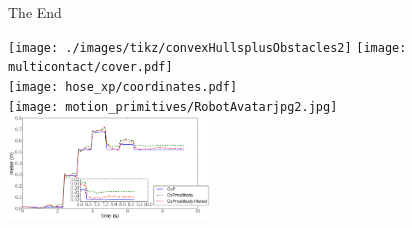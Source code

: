 \documentclass{beamer}
\begin{document}
\begin{frame}{The End}
\vspace*{-0.5cm}
\begin{center}
\texttt{[image: ./images/tikz/convexHullsplusObstacles2]}
\hspace*{1cm}
\texttt{[image: multicontact/cover.pdf]}\\
\texttt{[image: hose\_xp/coordinates.pdf]}
\scalebox{0.7}{}\\
\texttt{[image: motion\_primitives/RobotAvatarjpg2.jpg]}
\hspace*{1cm}
\includegraphics[width=0.4\textwidth, height=0.25\textheight, keepaspectratio]
{./figures/nmpc_walkgen/copmbpres.pdf}
\end{center}
\end{frame}
\end{document}
